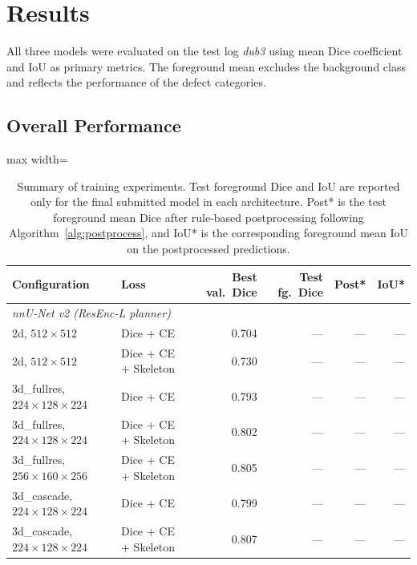 \chapter{Results}
\label{chap:results}

All three models were evaluated on the test log \textit{dub3} using mean Dice coefficient and IoU as primary metrics. The foreground mean excludes the background class and reflects the performance of the defect categories.

\section{Overall Performance}

\begin{table}[H]
\centering
\caption{Summary of training experiments. Test foreground Dice and IoU are reported only for the final submitted model in each architecture. Post* is the test foreground mean Dice after rule-based postprocessing following Algorithm~\ref{alg:postprocess}, and IoU* is the corresponding foreground mean IoU on the postprocessed predictions.}
\label{tab:all_experiments}
\begin{adjustbox}{max width=\textwidth}
\begin{tabular}{llrrrr}
\toprule
\textbf{Configuration} & \textbf{Loss} & \textbf{Best val.\ Dice} & \textbf{Test fg.\ Dice} & \textbf{Post*} & \textbf{IoU*} \\
\midrule
\multicolumn{6}{l}{\textit{nnU-Net v2 (ResEnc-L planner)}} \\
\midrule
2d, $512 \times 512$                                & Dice + CE             & 0.704 & --- & --- & --- \\
2d, $512 \times 512$                                & Dice + CE + Skeleton  & 0.730 & --- & --- & --- \\
3d\_fullres, $224 \times 128 \times 224$            & Dice + CE             & 0.793 & --- & --- & --- \\
3d\_fullres, $224 \times 128 \times 224$            & Dice + CE + Skeleton  & 0.802 & --- & --- & --- \\
3d\_fullres, $256 \times 160 \times 256$            & Dice + CE + Skeleton  & 0.805 & --- & --- & --- \\
3d\_cascade, $224 \times 128 \times 224$            & Dice + CE             & 0.799 & --- & --- & --- \\
3d\_cascade, $224 \times 128 \times 224$            & Dice + CE + Skeleton  & 0.807 & --- & --- & --- \\

\end{tabular}
\end{adjustbox}
\end{table}
